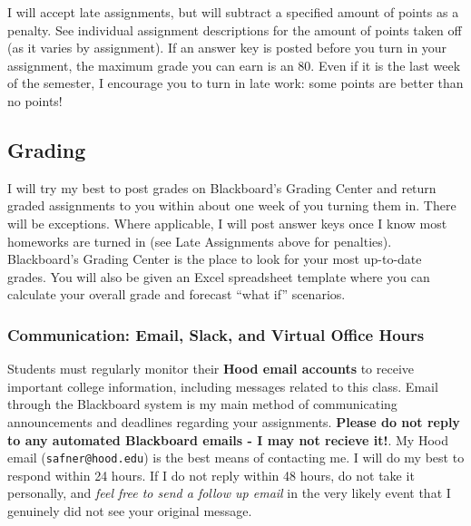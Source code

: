 \documentclass{article}
\begin{document}
I will accept late assignments, but will subtract a specified amount of
points as a penalty. See individual assignment descriptions for the
amount of points taken off (as it varies by assignment). If an answer
key is posted before you turn in your assignment, the maximum grade you
can earn is an 80. Even if it is the last week of the semester, I
encourage you to turn in late work: some points are better than no
points!

\hypertarget{grading}{%
\subsection*{Grading}\label{grading}}

I will try my best to post grades on Blackboard's Grading Center and
return graded assignments to you within about one week of you turning
them in. There will be exceptions. Where applicable, I will post answer
keys once I know most homeworks are turned in (see Late Assignments
above for penalties). Blackboard's Grading Center is the place to look
for your most up-to-date grades. You will also be given an Excel
spreadsheet template where you can calculate your overall grade and
forecast ``what if'' scenarios.

\hypertarget{communication-email-slack-and-virtual-office-hours}{%
\subsubsection*{Communication: Email, Slack, and Virtual Office
Hours}\label{communication-email-slack-and-virtual-office-hours}}

Students must regularly monitor their \textbf{Hood email accounts} to
receive important college information, including messages related to
this class. Email through the Blackboard system is my main method of
communicating announcements and deadlines regarding your assignments.
\textbf{Please do not reply to any automated Blackboard emails - I may
not recieve it!}. My Hood email (\texttt{safner@hood.edu}) is the best
means of contacting me. I will do my best to respond within 24 hours. If
I do not reply within 48 hours, do not take it personally, and
\emph{feel free to send a follow up email} in the very likely event that
I genuinely did not see your original message.
\end{document}
